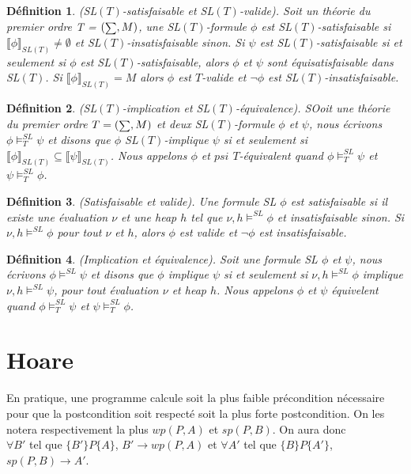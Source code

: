 \documentclass[9pt]{book}
\newcommand\phibra{\llbracket\phi\rrbracket}
\newcommand\psibra{\llbracket\psi\rrbracket}
\newcommand\smallsum{\mathsmaller\sum}
\newtheorem{definition}{D\'efinition}[section]
\begin{document}
\begin{definition}
(SL$(T)$-satisfaisable et SL$(T)$-valide). Soit un th\'eorie du premier ordre T = $(\smallsum,M)$, une SL$(T)$-formule $\phi$ est SL$(T)$-satisfaisable si $\phibra_{SL(T)}\neq\emptyset$ et SL$(T)$-insatisfaisable sinon. Si $\psi$ est SL$(T)$-satisfaisable si et seulement si $\phi$ est SL$(T)$-satisfaisable, alors $\phi$ et $\psi$ sont \textit{\'equisatisfaisable} dans SL$(T)$. Si $\phibra_{SL(T)}=M$ alors $\phi$ est $T$-valide et $\neg\phi$ est SL$(T)$-insatisfaisable.
\end{definition}

\begin{definition}
(SL$(T)$-implication et SL$(T)$-\'equivalence). SOoit une th\'eorie du premier ordre $T=(\smallsum,M)$ et deux SL$(T)$-formule $\phi$ et $\psi$, nous \'ecrivons $\phi\models^{SL}_{T}\psi$ et disons que $\phi$ SL$(T)$-implique $\psi$ si et seulement si $\phibra_{SL(T)}\subseteq\psibra_{SL(T)}$. Nous appelons $\phi$ et $psi$ $T$-\'equivalent quand  $\phi\models^{SL}_{T}\psi$ et $\psi\models^{SL}_{T}\phi$. 
\end{definition}

\begin{definition}
(Satisfaisable et valide). Une formule SL $\phi$ est satisfaisable si il existe une \'evaluation $\nu$ et une heap $h$ tel que $\nu,h\models^{SL}\phi$ et \textit{insatisfaisable} sinon. Si $\nu,h\models^{SL}\phi$ pour tout $\nu$ et $h$, alors $\phi$ est valide et $\neg\phi$ est insatisfaisable.
\end{definition}

\begin{definition}
(Implication et \'equivalence). Soit une formule SL $\phi$ et $\psi$, nous \'ecrivons $\phi\models^{SL}\psi$ et disons que $\phi$ implique $\psi$ si et seulement si $\nu,h\models^{SL}\phi$ implique $\nu,h\models^{SL}\psi$, pour tout \'evaluation $\nu$ et heap $h$. Nous appelons $\phi$ et $\psi$ \'equivelent quand $\phi\models^{SL}_{T}\psi$ et $\psi\models^{SL}_{T}\phi$. 
\end{definition}
	\section{Hoare}
	En pratique, une programme calcule soit la plus faible pr\'econdition n\'ecessaire pour que la postcondition soit respect\'e soit la plus forte postcondition. On les notera respectivement la plus $wp(P,A)$ et $sp(P, B)$. On aura donc \\$\forall B'$ tel que $\{B'\}P\{A\}$, $B' \rightarrow wp(P,A)$ et $\forall A'$ tel que $\{B\}P\{A'\}$, $sp(P,B) \rightarrow A'$. 
\end{document}
